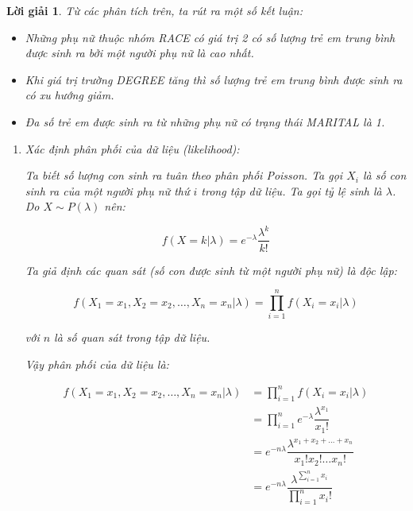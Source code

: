 \documentclass[14pt, a4paper]{article}
\theoremstyle{sltheorem}
\theoremstyle{soltheorem}
\newtheorem*{loigiai}{Lời giải}
\begin{document}
\begin{loigiai}
    Từ các phân tích trên, ta rút ra một số kết luận:

    \begin{itemize}
        \item Những phụ nữ thuộc nhóm RACE có giá trị 2 có số lượng trẻ em trung bình được sinh ra bởi một người phụ nữ là cao nhất.
        \item Khi giá trị trường DEGREE tăng thì số lượng trẻ em trung bình được sinh ra có xu hướng giảm.
        \item Đa số trẻ em được sinh ra từ những phụ nữ có trạng thái MARITAL là 1.
    \end{itemize}

    \begin{enumerate}
        \item Xác định phân phối của dữ liệu (likelihood):
        
        Ta biết số lượng con sinh ra tuân theo phân phối Poisson.
        Ta gọi $X_i$ là số con sinh ra của một người phụ nữ thứ $i$ trong tập dữ liệu.
        Ta gọi tỷ lệ sinh là $\lambda$.
        Do $X \sim P(\lambda)$ nên:

        \begin{equation*}
            f(X=k \vert \lambda) = e^{-\lambda} \dfrac{\lambda^k}{k!}
        \end{equation*}

        Ta giả định các quan sát (số con được sinh từ một người phụ nữ) là độc lập:

        \begin{equation*}
            f(X_1=x_1,X_2=x_2,\dots, X_n=x_n \vert \lambda) = \prod_{i=1}^n f(X_i = x_i \vert \lambda)
        \end{equation*}

        với $n$ là số quan sát trong tập dữ liệu.

        Vậy phân phối của dữ liệu là:

        \begin{equation*}
            \begin{aligned}
                f(X_1=x_1,X_2=x_2,\dots, X_n=x_n \vert \lambda) &= \prod_{i=1}^n f(X_i = x_i \vert \lambda) \\
                &= \prod_{i=1}^n e^{-\lambda} \dfrac{\lambda^{x_1}}{x_1!} \\
                &= e^{-n\lambda} \dfrac{\lambda^{x_1 + x_2 + \dots + x_n}}{x_1! x_2! \dots x_n!} \\
                &= e^{-n\lambda} \dfrac{\lambda^{\sum_{i=1}^n x_i}}{\prod_{i=1}^n x_i!}
            \end{aligned}
        \end{equation*}


\end{enumerate}
\end{loigiai}
\end{document}
